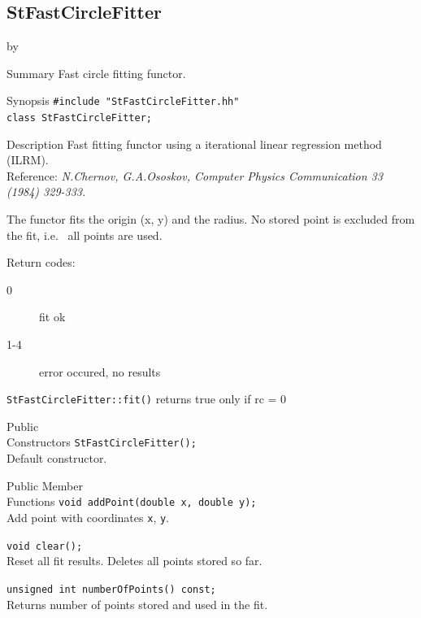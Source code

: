 \documentclass[twoside]{article}
\newcommand{\entrylabel}[1]{\mbox{\textbf{{#1}}}\hfil}%
\newenvironment{entry}
{\begin{list}{}%
    {\renewcommand{\makelabel}{\entrylabel}%
     \setlength{\labelwidth}{90pt}%
     \setlength{\leftmargin}{\labelwidth}
     \advance\leftmargin by \labelsep%
      }%
    }%
  {\end{list}}
\newcommand{\Entrylabel}[1]%
{\raisebox{0pt}[1ex][0pt]{\makebox[\labelwidth][l]%
    {\parbox[t]{\labelwidth}{\hspace{0pt}\textbf{{#1}}}}}}
\newenvironment{Entry}%
{\renewcommand{\entrylabel}{\Entrylabel}\begin{entry}}%
  {\end{entry}}
\begin{document}
%
%
\subsection{StFastCircleFitter } \label{StFastCircleFitter}
\begin{Entry}
\item[Summary]
     Fast circle fitting functor.
     
\item[Synopsis]
  \verb+#include "StFastCircleFitter.hh"+ \\
  \verb+class StFastCircleFitter;+
  
    
\item[Description]   
  Fast fitting functor using a iterational linear regression 
  method (ILRM).\\
  Reference: \textit{N.Chernov, G.A.Ososkov, Computer  
  Physics Communication 33 (1984) 329-333.}              

  The functor fits the origin (x, y) and the radius. No stored
  point is excluded from the fit, i.e.~ all points are used.
  
  Return codes:
  \begin{description}
      \item[0]    fit ok 
      \item[1-4]  error occured, no results
  \end{description}
  \texttt{StFastCircleFitter::fit()} returns true only if rc = 0

\item[Public\\ Constructors]
    \verb+StFastCircleFitter();+\\
    Default constructor. 
    
\item[Public Member\\ Functions]
    \verb+void addPoint(double x, double y);+\\
    Add point with coordinates \texttt{x}, \texttt{y}.

    \verb+void clear();+\\
    Reset all fit results. Deletes all points stored so far.

    \verb+unsigned int numberOfPoints() const;+\\
    Returns number of points stored and used in the fit.
    

\end{Entry}
\end{document}
